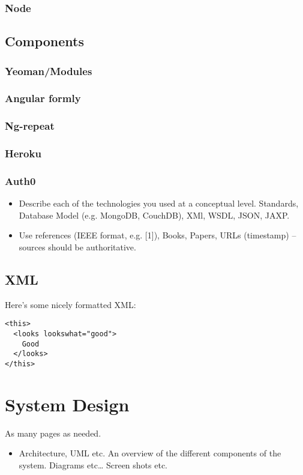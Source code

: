 \subsection{Node}


\section{Components}
\subsection{Yeoman/Modules}
\subsection{Angular formly}
\subsection{Ng-repeat}
\subsection{Heroku}
\subsection{Auth0}





\begin{itemize}
\item Describe each of the technologies you used at a conceptual level. Standards, Database Model (e.g. MongoDB, CouchDB), XMl, WSDL, JSON, JAXP.
\item Use references (IEEE format, e.g. [1]), Books, Papers, URLs (timestamp) – sources should be authoritative. 
\end{itemize}

\section{XML}
Here's some nicely formatted XML:
\begin{verbatim}
<this>
  <looks lookswhat="good">
    Good
  </looks>
</this>
\end{verbatim}

\chapter{System Design}
As many pages as needed.
\begin{itemize}
\item Architecture, UML etc. An overview of the different components of the system. Diagrams etc… Screen shots etc.
\end{itemize}

